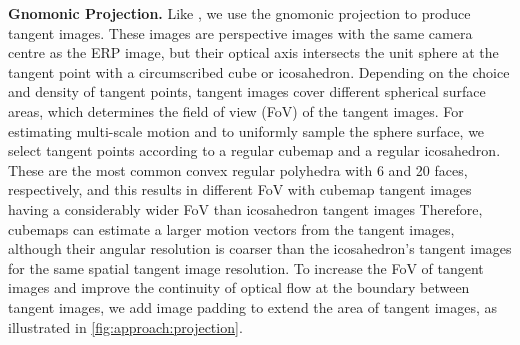 \textbf{Gnomonic Projection.}
%
Like \citet{ZhaoYZLBT2020}, we use the gnomonic projection to produce tangent images.
These images are perspective images with the same camera centre as the ERP image, but their optical axis intersects the unit sphere at the tangent point with a circumscribed cube or icosahedron.
%
Depending on the choice and density of tangent points, tangent images cover different spherical surface areas, which determines the field of view (FoV) of the tangent images.
%
For estimating multi-scale motion and to uniformly sample the sphere surface, we select tangent points according to a regular cubemap and a regular icosahedron.
These are the most common convex regular polyhedra with 6 and 20 faces, respectively, and this results in different FoV with cubemap tangent images having a considerably wider FoV than icosahedron tangent images
%
Therefore, cubemaps can estimate a larger motion vectors from the tangent images, although their angular resolution is coarser than the icosahedron's tangent images for the same spatial tangent image resolution.
%
To increase the FoV of tangent images and improve the continuity of optical flow at the boundary between tangent images, we add image padding to extend the area of tangent images, as illustrated in \cref{fig:approach:projection}.


